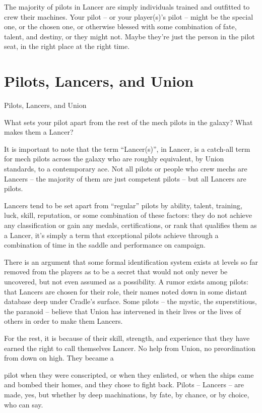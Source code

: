The majority of pilots in Lancer are simply individuals trained and outfitted to crew their
machines. Your pilot -- or your player(s)’s pilot -- might be the special one, or the chosen one, or
otherwise blessed with some combination of fate, talent, and destiny, or they might not. Maybe
they’re just the person in the pilot seat, in the right place at the right time.
\section{Pilots, Lancers, and Union}
Pilots, Lancers, and Union

What sets your pilot apart from the rest of the mech pilots in the galaxy? What makes them a
Lancer?

It is important to note that the term “Lancer(s)”, in Lancer, is a catch-all term for mech pilots
across the galaxy who are roughly equivalent, by Union standards, to a contemporary ace. Not all
pilots or people who crew mechs are Lancers -- the majority of them are just competent pilots --
but all Lancers are pilots.

Lancers tend to be set apart from “regular” pilots by ability, talent, training, luck, skill, reputation, or
some combination of these factors: they do not achieve any classification or gain any medals,
certifications, or rank that qualifies them as a Lancer, it’s simply a term that exceptional pilots
achieve through a combination of time in the saddle and performance on campaign.

There is an argument that some formal identification system exists at levels so far removed from
the players as to be a secret that would not only never be uncovered, but not even assumed as a
possibility. A rumor exists among pilots: that Lancers are chosen for their role, their names noted
down in some distant database deep under Cradle’s surface. Some pilots -- the mystic, the
superstitious, the paranoid -- believe that Union has intervened in their lives or the lives of others
in order to make them Lancers.

For the rest, it is because of their skill, strength, and experience that they have earned the right to
call themselves Lancer. No help from Union, no preordination from down on high. They became a




pilot when they were conscripted, or when they enlisted, or when the ships came and bombed
their homes, and they chose to fight back. Pilots -- Lancers -- are made, yes, but whether by deep
machinations, by fate, by chance, or by choice, who can say.

